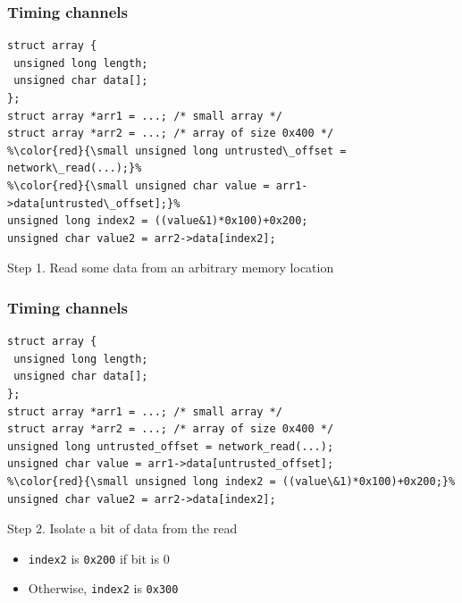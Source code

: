\documentclass[10pt]{beamer}
\begin{document}

\begin{frame}[fragile]

\frametitle{Timing channels}

\begin{lstlisting}[basicstyle=\small,style=customjava]
struct array {
 unsigned long length;
 unsigned char data[];
};
struct array *arr1 = ...; /* small array */
struct array *arr2 = ...; /* array of size 0x400 */
%\color{red}{\small unsigned long untrusted\_offset = network\_read(...);}%
%\color{red}{\small unsigned char value = arr1->data[untrusted\_offset];}%
unsigned long index2 = ((value&1)*0x100)+0x200;
unsigned char value2 = arr2->data[index2];
\end{lstlisting}

\begin{center}
Step 1. Read some data from an arbitrary memory location
\end{center}

\end{frame}


\begin{frame}[fragile]

\frametitle{Timing channels}

\begin{lstlisting}[basicstyle=\small,style=customjava]
struct array {
 unsigned long length;
 unsigned char data[];
};
struct array *arr1 = ...; /* small array */
struct array *arr2 = ...; /* array of size 0x400 */
unsigned long untrusted_offset = network_read(...);
unsigned char value = arr1->data[untrusted_offset];
%\color{red}{\small unsigned long index2 = ((value\&1)*0x100)+0x200;}%
unsigned char value2 = arr2->data[index2];
\end{lstlisting}

\begin{center}
Step 2. Isolate a bit of data from the read \pause
\begin{itemize}
\item \texttt{index2} is \texttt{0x200} if bit is 0
\item Otherwise, \texttt{index2} is \texttt{0x300}
\end{itemize}
\end{center}

\end{frame}

\end{document}
